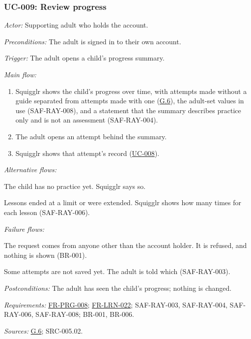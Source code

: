 \documentclass[12pt]{article}
\renewcommand{\_}{\textunderscore\allowbreak}%
\newcommand{\goalref}[1]{\hyperref[goal:#1]{G.#1}}
\newcommand{\ucref}[1]{\hyperref[uc:#1]{\mbox{UC-#1}}}
\newcommand{\reqfield}[2]{\noindent\textit{#1:} #2\par}
\newcommand{\reqref}[1]{\hyperref[req:#1]{#1}}
\providecommand{\ucref}[1]{\hyperref[uc:#1]{UC-#1}}
\begin{document}
\subsubsection{UC-009: Review progress}
\label{puc:009}
\reqfield{Actor}{Supporting adult who holds the account.}
\reqfield{Preconditions}{The adult is signed in to their own account.}
\reqfield{Trigger}{The adult opens a child's progress summary.}
\noindent\textit{Main flow:}
\begin{enumerate}[nosep, leftmargin=2.2em]
  \item Squigglr shows the child's progress over time, with attempts made
  without a guide separated from attempts made with one (\goalref{6}), the
  adult-set values in use (\mbox{SAF-RAY-008}), and a statement that the summary
  describes practice only and is not an assessment (\mbox{SAF-RAY-004}).
  \item The adult opens an attempt behind the summary.
  \item Squigglr shows that attempt's record (\ucref{008}).
\end{enumerate}
\noindent\textit{Alternative flows:}
\begin{description}[nosep, leftmargin=2.2em, font=\normalfont]
  \item[1a.] The child has no practice yet. Squigglr says so.
  \item[1b.] Lessons ended at a limit or were extended. Squigglr shows how many
  times for each lesson (\mbox{SAF-RAY-006}).
\end{description}
\noindent\textit{Failure flows:}
\begin{description}[nosep, leftmargin=2.2em, font=\normalfont]
  \item[1c.] The request comes from anyone other than the account holder. It is
  refused, and nothing is shown (BR-001).
  \item[1d.] Some attempts are not saved yet. The adult is told which
  (\mbox{SAF-RAY-003}).
\end{description}
\reqfield{Postconditions}{The adult has seen the child's progress; nothing is
changed.} \reqfield{Requirements}{\reqref{FR-PRG-008};
\mbox{\reqref{FR-LRN-022}}; \mbox{SAF-RAY-003}, \mbox{SAF-RAY-004},
\mbox{SAF-RAY-006}, \mbox{SAF-RAY-008}; BR-001, BR-006.}
\reqfield{Sources}{\goalref{6}; \mbox{SRC-005.02}.}
\end{document}

